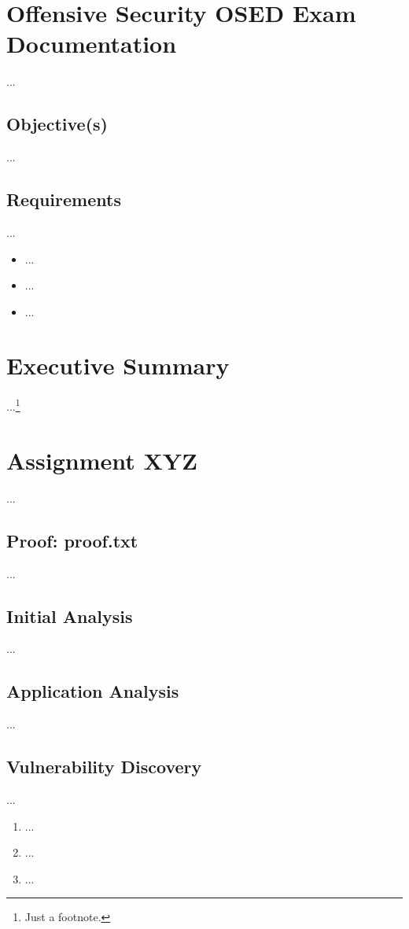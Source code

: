 %
%
%
\section{Offensive Security OSED Exam Documentation}\label{osed-sec:sec1}
%
...
%
%
%
\subsection{Objective(s)}\label{osed-sec:sec1-obj}
%
...
%
%
%
%
\subsection{Requirements}\label{osed-sec:sec1-req}
%
...

\begin{itemize}
    \item ...
    \item ...
    \item ...
\end{itemize}
%
%
%
\section{Executive Summary}\label{osed-sec:sec2}
%
...\footnote{Just a footnote.}
%
%
%
\section{Assignment XYZ}\label{osed-sec:sec3}
%
...
%
%
%
\subsection{Proof: proof.txt}\label{osed-sec:sec3-proof}
%
...
%
%
%
\subsection{Initial Analysis}\label{osed-sec:sec3-init}
%
...
%
%
%
\subsection{Application Analysis}\label{osed-sec:sec3-app}
%
...
%
%
%
\subsection{Vulnerability Discovery}\label{osed-sec:sec3-vuln}
%
...

\begin{enumerate}
    \item ...
    \item ...
    \item ...
\end{enumerate}
%
%
%
